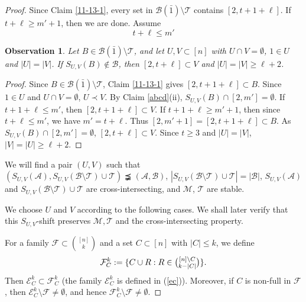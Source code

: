 \documentclass[11pt]{article}
\def\marrow{{\boldmath {\marginpar[\hfill$\rightarrow \rightarrow$]{$\leftarrow \leftarrow$}}}}
\def\andrey#1{{\sc Andrey: }{\marrow\sf \textcolor{blue}{#1}}}
\newcommand{\m}{\mathcal}
\newtheorem{obser}[theorem]{Observation}
\begin{document}
\begin{proof} 
Since Claim \ref{11-13-1}, every set in $\m B(\bar1) \setminus \m T$ contains $[2,t+1+\ell]$. 
If $t+\ell\ge m'+1$, then we are done. Assume 
\[
t+\ell\le m'
\]

\begin{obser}\label{obser3}
Let $B \in \m B(\bar1) \setminus \m T$, and let $U,V\subset [n]$ with $U\cap V=\emptyset$, $1\in U$ and $|U|=|V|$. If  $S_{U,V}(B)\not\in \m B$, then $[2,t+\ell]\subset V$ and $|U|=|V|\ge \ell+2$. 
\end{obser}

\begin{proof}
Since $B \in \m B(\bar1) \setminus \m T$, Claim \ref{11-13-1} gives $[2,t+1+\ell]\subset B$. 
Since $1\in U$ and $U\cap V=\emptyset$, $U\prec V$. 
By Claim \ref{abcd}(ii), $S_{U,V}(B)\cap [2,m']=\emptyset$.
If $t+1+\ell\le m'$, then $[2,t+1+\ell]\subset V$. 
If $t+1+\ell\ge m'+1$, then since $t+\ell \le m'$, we have $m'=t+\ell$. Thus $[2,m'+1]=[2,t+1+\ell]\subset B$.
As $S_{U,V}(B)\cap [2,m']=\emptyset$, $[2, t+\ell]\subset V$. Since $t\ge 3$ and $|U|=|V|$, $|V|=|U|\ge \ell+2$.
\end{proof}

We will find a pair $(U,V)$ such that $(S_{U,V}(\m A), S_{U,V}(\m B\setminus \m T)\cup \m T)\precneqq (\m A, \m B)$, $|S_{U,V}(\m B\setminus \m T)\cup \m T|=|\m B|$,
$S_{U,V}(\m A)$ and $S_{U,V}(\m B\setminus \m T)\cup \m T$ are cross-intersecting, and $\m M $, $\m T$ are stable. 



We choose $U$ and $V$ according to the following cases.  
We shall later verify that this $S_{U,V}$-shift preserves $\m M, \m T$ and the cross-intersecting property.

For a family $\m F\subset {[n]\choose k}$ and a set $C\subset [n]$ with $|C|\le k$, we define
\begin{equation}\label{fc}
    \mathcal{F}^k_C:=\{C\cup R: R\in \tbinom{[n]\setminus C}{ k-|C|}\}.
\end{equation}
Then $\mathcal{E}^k_C\subset \mathcal{F}^k_C$ (the family $\mathcal{E}^k_C$ is defined in (\ref{ec})). Moreover, if $C$ is non-full in $\m F$, then $\mathcal{E}^k_C\setminus \m F \ne \emptyset$, and hence
$\mathcal{F}^k_C\setminus \m F \ne \emptyset$. %


\end{proof}
\end{document}
